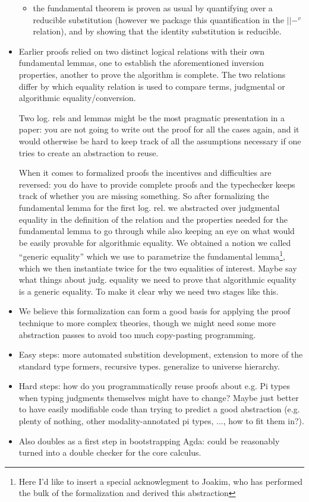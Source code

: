 \documentclass{book}
\begin{document}
\begin{itemize}
\begin{itemize}
   \item the fundamental theorem is proven as usual by quantifying over a
   reducible substitution (however we package this quantification in
   the $||-^v$ relation), and by showing that the identity substitution
   is reducible.
   \end{itemize}

 \item Earlier proofs relied on two distinct logical relations with their
 own fundamental lemmas, one to establish the aforementioned inversion
 properties, another to prove the algorithm is complete.
 The two relations differ by which equality relation is used to
 compare terms, judgmental or algorithmic equality/conversion.

 Two log. rels and lemmas might be the most pragmatic presentation in
 a paper: you are not going to write out the proof for all the cases
 again, and it would otherwise be hard to keep track of all the
 assumptions necessary if one tries to create an abstraction to reuse.

 When it comes to formalized proofs the incentives and difficulties
 are reversed: you do have to provide complete proofs and the
 typechecker keeps track of whether you are missing something. So
 after formalizing the fundamental lemma for the first log. rel. we
 abstracted over judgmental equality in the definition of the relation
 and the properties needed for the fundamental lemma to go through
 while also keeping an eye on what would be easily provable for
 algorithmic equality.  We obtained a notion we called ``generic
 equality'' which we use to parametrize the fundamental
 lemma\footnote{Here I'd like to insert a special acknowlegment to
   Joakim, who has performed the bulk of the formalization and derived
   this abstraction}, which we then instantiate twice for the two
 equalities of interest.
 Maybe say what things about judg. equality we need to prove that
   algorithmic equality is a generic equality. To make it clear why we need two stages like this.

 \item We believe this formalization can form a good basis for applying
 the proof technique to more complex theories, though we might need
 some more abstraction passes to avoid too much copy-pasting programming.

 \item Easy steps: more automated substition development, extension to
 more of the standard type formers, recursive types. generalize to universe hierarchy.

 \item Hard steps: how do you programmatically reuse proofs about e.g. Pi
 types when typing judgments themselves might have to change? Maybe
 just better to have easily modifiable code than trying to predict a
 good abstraction (e.g. plenty of nothing, other modality-annotated pi types, ..., how to fit them in?).

 \item Also doubles as a first step in bootstrapping Agda: could be
 reasonably turned into a double checker for the core calculus.
\end{itemize}
\end{document}
